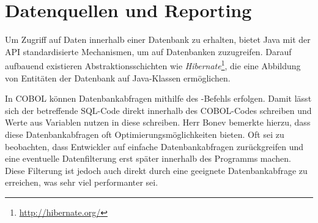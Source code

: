 \section{Datenquellen und Reporting}\label{reporting}


Um Zugriff auf Daten innerhalb einer Datenbank zu erhalten, bietet Java mit der  API standardisierte Mechanismen, um auf Datenbanken zuzugreifen. Darauf aufbauend existieren Abstraktionsschichten wie \textit{Hibernate}\footnote{\url{http://hibernate.org/} \visitedOn}, die eine Abbildung von Entitäten der Datenbank auf Java-Klassen ermöglichen.

In COBOL können Datenbankabfragen mithilfe des -Befehls erfolgen. Damit lässt sich der betreffende SQL-Code direkt innerhalb des COBOL-Codes schreiben und Werte aus Variablen nutzen \bzw in diese schreiben. Herr Bonev bemerkte hierzu, dass diese Datenbankabfragen oft Optimierungsmöglichkeiten bieten. Oft sei zu beobachten, dass Entwickler auf einfache Datenbankabfragen zurückgreifen und eine eventuelle Datenfilterung erst später innerhalb des Programms machen. Diese Filterung ist jedoch auch direkt durch eine geeignete Datenbankabfrage zu erreichen, was sehr viel performanter sei. 


